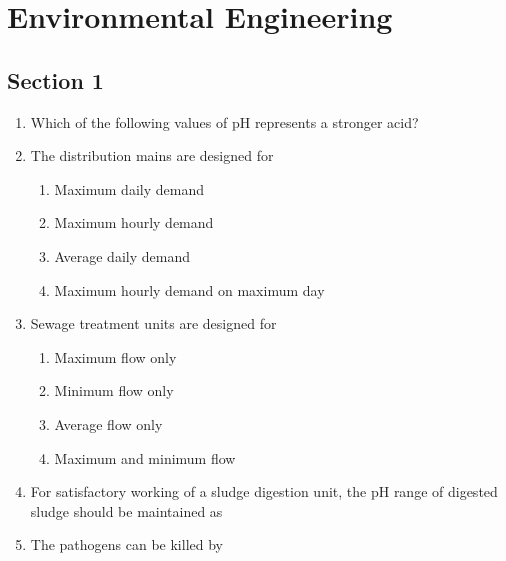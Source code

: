 \documentclass[11pt,a4paper]{article}
\begin{document}
\section{Environmental Engineering}
\subsection*{Section 1}
\begin{enumerate}
\item{Which of the following values of pH represents a stronger acid?}
\\
\item{The distribution mains are designed for}
\begin{enumerate}[label=\Alph*.]
\item{Maximum daily demand}
\item{Maximum hourly demand}
\item{Average daily demand}
\item{Maximum hourly demand on maximum day}
\end{enumerate}
\item{Sewage treatment units are designed for}
\begin{enumerate}[label=\Alph*.]
\item{Maximum flow only}
\item{Minimum flow only}
\item{Average flow only}
\item{Maximum and minimum flow}
\end{enumerate}
\item{For satisfactory working of a sludge digestion unit, the pH range of digested sludge should be maintained as}
\\
\item{The pathogens can be killed by}
\begin{enumerate}[label=\Alph*.]

\end{enumerate}
\end{enumerate}
\end{document}
